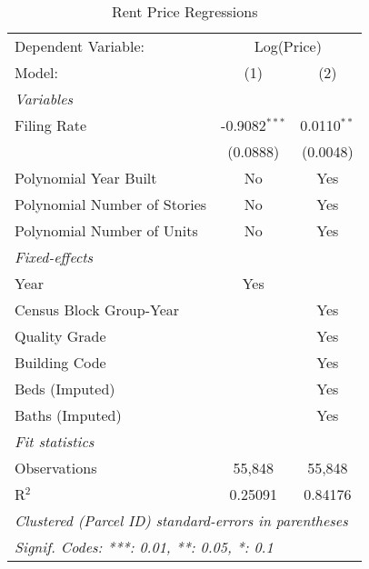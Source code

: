 \begin{table}[htbp]
   \caption{\label{tab:rent_regs} Rent Price Regressions}
   \centering
   \begin{tabular}{lcc}
      \tabularnewline \midrule \midrule
      Dependent Variable: & \multicolumn{2}{c}{Log(Price)}\\
      Model:                       & (1)             & (2)\\  
      \midrule
      \emph{Variables}\\
      Filing Rate                  & -0.9082$^{***}$ & 0.0110$^{**}$\\   
                                   & (0.0888)        & (0.0048)\\   
      Polynomial Year Built        & No              & Yes\\  
      Polynomial Number of Stories & No              & Yes\\  
      Polynomial Number of Units   & No              & Yes\\  
      \midrule
      \emph{Fixed-effects}\\
      Year                         & Yes             & \\  
      Census Block Group-Year      &                 & Yes\\  
      Quality Grade                &                 & Yes\\  
      Building Code                &                 & Yes\\  
      Beds (Imputed)               &                 & Yes\\  
      Baths (Imputed)              &                 & Yes\\  
      \midrule
      \emph{Fit statistics}\\
      Observations                 & 55,848          & 55,848\\  
      R$^2$                        & 0.25091         & 0.84176\\  
      \midrule \midrule
      \multicolumn{3}{l}{\emph{Clustered (Parcel ID) standard-errors in parentheses}}\\
      \multicolumn{3}{l}{\emph{Signif. Codes: ***: 0.01, **: 0.05, *: 0.1}}\\
   \end{tabular}
\end{table}
